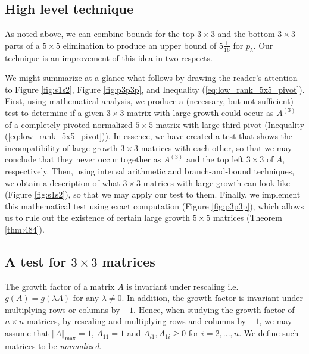 \documentclass[reqno]{amsart}
\numberwithin{equation}{section}
\newcommand{\norm}[1]{\left\Vert #1 \right\Vert}
\begin{document}
\subsection{High level technique} 
As noted above, we can combine bounds for the top $3\times 3$  and the bottom $3\times 3$ 
parts of a $5\times 5$ elimination to produce 
an upper bound of $5 \frac{1}{16}$ for $p_5$.
Our technique is an improvement of this idea in two respects. 

We might summarize at a glance what follows 
by 
drawing the reader's attention to Figure \ref{fig:s1s2}, Figure \ref{fig:p3p3p}, and Inequality (\ref{eq:low_rank_5x5_pivot}).
First, using mathematical analysis, we produce a (necessary, but not sufficient) test to determine if a given $3\times 3$ matrix with large growth could occur as $A^{(3)}$ of a completely pivoted normalized $ 5 \times 5$ matrix with large third pivot (Inequality (\ref{eq:low_rank_5x5_pivot})). In essence, we have created a test that shows the incompatibility of large growth $3 \times 3$ matrices with each other, so that we may conclude that they never occur together as $A^{(3)}$ and the top left $3 \times 3$ of $A$, respectively. Then, using interval arithmetic and branch-and-bound techniques, we obtain a description of what $3 \times 3$ matrices with large growth can look like (Figure \ref{fig:s1s2}), so that we may apply our test to them. Finally, we implement this mathematical test using exact computation (Figure \ref{fig:p3p3p}), which allows us to rule out the existence of certain large growth $5 \times 5$ matrices (Theorem \ref{thm:484}).



\subsection{A test for $3 \times 3$ matrices}\label{sub:3x3}
The growth factor of a matrix $A$ is invariant under rescaling i.e. $g(A) = g(\lambda A)$ for any $\lambda \neq 0$. In addition, the growth factor is invariant under multiplying rows or columns by $-1$. \color{black} Hence, when studying the growth factor of $n \times n$ matrices, by rescaling and multiplying rows and columns by $-1$, we may assume that $\norm{A}_{\max} = 1$, $A_{11} = 1$ and $A_{i1}, A_{1i} \geq 0$ for $i=2,...,n$. We define such matrices to be \textit{normalized}.
\end{document}

